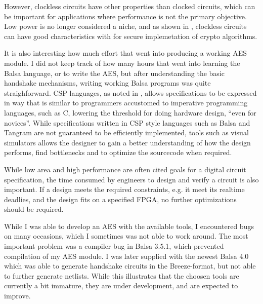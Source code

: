 However, clockless circuits have other properties than clocked
circuits, which can be important for applications where performance is
not the primary objective. Low power is no longer considered a niche,
and as shown in \cite{claes}, clockless circuits can have good
characteristics with for secure implemetation of crypto algorithms.

It is also interesting how much effort that went into producing a
working AES module. I did not keep track of how many hours that went
into learning the Balsa language, or to write the AES, but after
understanding the basic handshake mechanisms, writing working Balsa
programs was quite straighforward. CSP languages, as noted in
\cite{taylor}, allows specifications to be expressed in way that is
similar to programmers accustomed to imperative programming languages,
such as C, lowering the threshold for doing hardware design, ``even
for novices''. While specifications written in CSP style languages
such as Balsa and Tangram are not guaranteed to be efficiently
implemented, tools such as visual simulators allows the designer to
gain a better understanding of how the design performs, find
bottlenecks and to optimize the sourcecode when required.

While low area and high performance are often cited goals for a
digital circuit specification, the time consumed by engineers to
design and verify a circuit is also important. If a design meets the
required constraints, e.g. it meet its realtime deadlies, and the
design fits on a specified FPGA, no further optimizations should be
required.

While I was able to develop an AES with the available tools, I
encountered bugs on many occasions, which I sometimes was not able to
work around. The most important problem was a compiler bug in Balsa
3.5.1, which prevented compilation of my AES module. I was later
supplied with the newest Balsa 4.0 which was able to generate
handshake circuits in the Breeze-format, but not able to further
generate netlists. While this illustrates that the choosen tools are
currently a bit immature, they are under development, and are expected
to improve.

